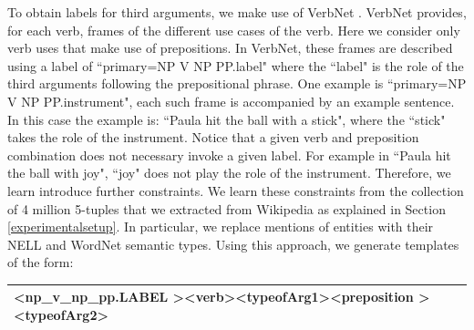 To obtain labels for third arguments, we make use of VerbNet \cite{KipperKRP08}. VerbNet provides, for each verb, frames of the different use cases of the verb. Here we consider only  verb uses  that make use of prepositions. In VerbNet, these frames are described using a  label of ``primary=NP V NP PP.label" where the ``label" is the role of the third arguments following the prepositional phrase. One example is ``primary=NP V NP PP.instrument", each such frame is accompanied by an example sentence. In this case the example is: ``Paula hit the ball  with a stick", where the ``stick" takes the role of the instrument. Notice  that a given  verb and preposition combination does not necessary invoke a given label. For example in ``Paula hit the ball with joy", ``joy" does not play the role of the instrument. Therefore,  we learn introduce further constraints. We learn these constraints from the collection of 4 million 5-tuples  that we extracted from Wikipedia as explained in Section \ref{experimentalsetup}. In particular, we  replace mentions of entities with their NELL and WordNet semantic types. Using this approach, we generate templates of the form:
  \begin{table}[h]
 \centering
     \begin{tabular}{ll}
       \hline
\textless np\_v\_np\_pp.LABEL \textgreater \textless verb\textgreater \textless typeofArg1\textgreater \textless preposition \textgreater \textless typeofArg2\textgreater \\
            \hline
     \end{tabular}
       \label{tab:ternarylabels}
     \end{table}
    

